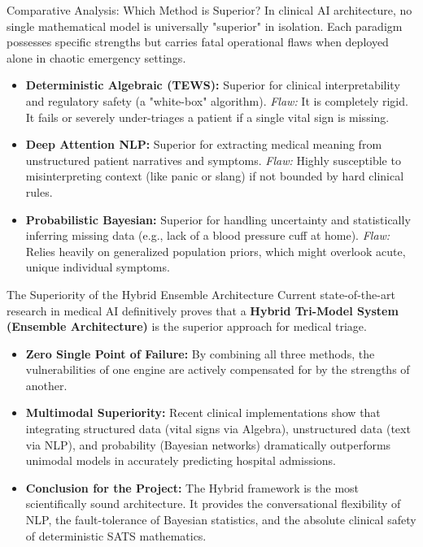 \documentclass[aspectratio=169]{beamer}
\begin{document}
	\begin{frame}{Comparative Analysis: Which Method is Superior?}
		In clinical AI architecture, no single mathematical model is universally "superior" in isolation. Each paradigm possesses specific strengths but carries fatal operational flaws when deployed alone in chaotic emergency settings.
		\vspace{0.2cm}
		\begin{itemize}
			\item \textbf{Deterministic Algebraic (TEWS):} Superior for clinical interpretability and regulatory safety (a "white-box" algorithm). \textit{Flaw:} It is completely rigid. It fails or severely under-triages a patient if a single vital sign is missing.
			\item \textbf{Deep Attention NLP:} Superior for extracting medical meaning from unstructured patient narratives and symptoms. \textit{Flaw:} Highly susceptible to misinterpreting context (like panic or slang) if not bounded by hard clinical rules.
			\item \textbf{Probabilistic Bayesian:} Superior for handling uncertainty and statistically inferring missing data (e.g., lack of a blood pressure cuff at home). \textit{Flaw:} Relies heavily on generalized population priors, which might overlook acute, unique individual symptoms.
		\end{itemize}
	\end{frame}
	
	\begin{frame}{The Superiority of the Hybrid Ensemble Architecture}
		Current state-of-the-art research in medical AI definitively proves that a \textbf{Hybrid Tri-Model System (Ensemble Architecture)} is the superior approach for medical triage.
		\vspace{0.2cm}
		\begin{itemize}
			\item \textbf{Zero Single Point of Failure:} By combining all three methods, the vulnerabilities of one engine are actively compensated for by the strengths of another. 
			\item \textbf{Multimodal Superiority:} Recent clinical implementations show that integrating structured data (vital signs via Algebra), unstructured data (text via NLP), and probability (Bayesian networks) dramatically outperforms unimodal models in accurately predicting hospital admissions.
			\item \textbf{Conclusion for the Project:} The Hybrid framework is the most scientifically sound architecture. It provides the conversational flexibility of NLP, the fault-tolerance of Bayesian statistics, and the absolute clinical safety of deterministic SATS mathematics.
		\end{itemize}
	\end{frame}
	
\end{document}
